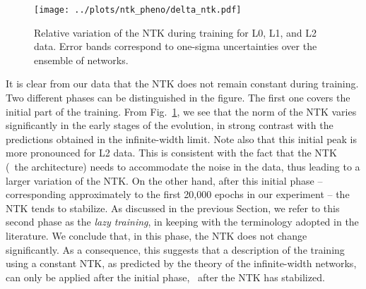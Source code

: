 \begin{figure}[ht!]
  \centering
  \texttt{[image: ../plots/ntk\_pheno/delta\_ntk.pdf]}
  \caption{Relative variation of the NTK during training for L0, L1, and L2
  data. Error bands correspond to one-sigma uncertainties over the ensemble of
  networks.}
  \label{fig:NTKTime}
\end{figure}

It is clear from our data that the NTK does not remain constant during training. 
Two different phases can be distinguished in the figure. The first one
covers the initial part of the training. From Fig.~\ref{fig:NTKTime}, we see
that the norm of the NTK varies significantly in the early stages of the evolution, in strong contrast with 
the predictions obtained in the infinite-width limit. Note also that this
initial peak is more pronounced for L2 data. This is consistent with the fact
that the NTK (\ie\ the architecture) needs to accommodate the noise in
the data, thus leading to a larger variation of the NTK. On the other hand,
after this initial phase -- corresponding approximately to the first 20,000 epochs in our experiment --
the NTK tends to stabilize. As discussed in the previous Section, we refer to this
second phase as the \textit{lazy training}, in keeping with the terminology
adopted in the literature. We conclude that, in this phase, the NTK does not
change significantly. As a consequence, this suggests that a description of 
the training using a constant NTK, as predicted by the theory of the
infinite-width networks, can only be applied after the initial
phase, \ie\ after the NTK has stabilized. 

\FloatBarrier

